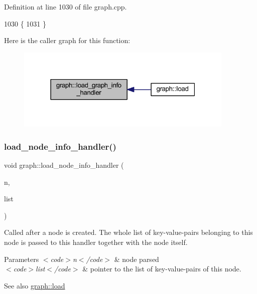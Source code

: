 Definition at line 1030 of file graph.\+cpp.


\begin{DoxyCode}
1030                                                 \{
1031 \}
\end{DoxyCode}
Here is the caller graph for this function\+:
\nopagebreak
\begin{figure}[H]
\begin{center}
\leavevmode
\includegraphics[width=295pt]{classgraph_aaca9ede8005388fd22b56e12280bf1bf_icgraph}
\end{center}
\end{figure}
\mbox{\label{classgraph_ae956c361413410987a54e2296af2572f}} 
\subsubsection{\texorpdfstring{load\+\_\+node\+\_\+info\+\_\+handler()}{load\_node\_info\_handler()}}
{\footnotesize\ttfamily void graph\+::load\+\_\+node\+\_\+info\+\_\+handler (\begin{DoxyParamCaption}\item[{\mbox{\hyperlink{classnode}{node}}}]{n,  }\item[{\mbox{\hyperlink{struct_g_m_l__pair}{G\+M\+L\+\_\+pair}} $\ast$}]{list }\end{DoxyParamCaption})\hspace{0.3cm}{\ttfamily [virtual]}}

Called after a node is created. The whole list of key-\/value-\/pairs belonging to this node is passed to this handler together with the node itself.


\begin{DoxyParams}{Parameters}
{\em $<$code$>$n$<$/code$>$} & node parsed \\
\hline
{\em $<$code$>$list$<$/code$>$} & pointer to the list of key-\/value-\/pairs of this node. \\
\hline
\end{DoxyParams}
\begin{DoxySeeAlso}{See also}
\mbox{\hyperlink{classgraph_ac28cb3468623a480709d3329033d4ec8}{graph\+::load}} 
\end{DoxySeeAlso}


